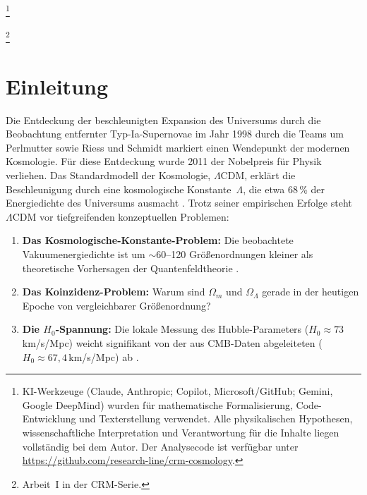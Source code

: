 \documentclass[aps,prd,twocolumn,superscriptaddress,nofootinbib]{revtex4-2}
\begin{document}

\thanks{KI-Werkzeuge (Claude, Anthropic; Copilot, Microsoft/GitHub; Gemini, Google DeepMind) wurden für mathematische Formalisierung, Code-Entwicklung und Texterstellung verwendet. Alle physikalischen Hypothesen, wissenschaftliche Interpretation und Verantwortung für die Inhalte liegen vollständig bei dem Autor. Der Analysecode ist verfügbar unter \url{https://github.com/research-line/crm-cosmology}.}

\thanks{Arbeit~I in der CRM-Serie.}

\maketitle


\section{Einleitung}
\label{sec:introduction}

Die Entdeckung der beschleunigten Expansion des Universums durch die Beobachtung entfernter Typ-Ia-Supernovae im Jahr 1998 durch die Teams um Perlmutter \cite{Perlmutter1999} sowie Riess und Schmidt \cite{Riess1998} markiert einen Wendepunkt der modernen Kosmologie. Für diese Entdeckung wurde 2011 der Nobelpreis für Physik verliehen. Das Standardmodell der Kosmologie, $\Lambda$CDM, erklärt die Beschleunigung durch eine kosmologische Konstante~$\Lambda$, die etwa 68\,\% der Energiedichte des Universums ausmacht \cite{Planck2020}. Trotz seiner empirischen Erfolge steht $\Lambda$CDM vor tiefgreifenden konzeptuellen Problemen:

\begin{enumerate}
\item \textbf{Das Kosmologische-Konstante-Problem:} Die beobachtete Vakuumenergiedichte ist um $\sim$60--120 Größenordnungen kleiner als theoretische Vorhersagen der Quantenfeldtheorie \cite{Weinberg1989}.
\item \textbf{Das Koinzidenz-Problem:} Warum sind $\Omega_m$ und $\Omega_\Lambda$ gerade in der heutigen Epoche von vergleichbarer Größenordnung?
\item \textbf{Die $H_0$-Spannung:} Die lokale Messung des Hubble-Parameters ($H_0 \approx 73$\,km/s/Mpc) weicht signifikant von der aus CMB-Daten abgeleiteten ($H_0 \approx 67{,}4$\,km/s/Mpc) ab \cite{Planck2020, Riess2022}.
\end{enumerate}
\end{document}
